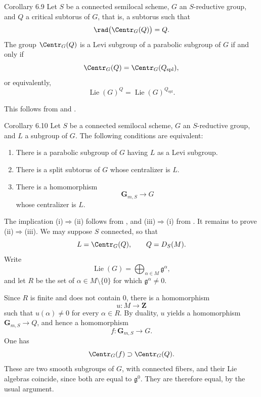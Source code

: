 \begin{sgastatement}{Corollary 6.9}
Let \(S\) be a connected semilocal scheme, \(G\) an
\(S\)-reductive group, and \(Q\) a critical subtorus of \(G\), that
is, a subtorus such that
\[
 \rad\bigl(\Centr_G(Q)\bigr)=Q.
\]
The group \(\Centr_G(Q)\) is a Levi subgroup of a parabolic subgroup
of \(G\) if and only if
\[
 \Centr_G(Q)=\Centr_G(Q_{\mathrm{spl}}),
\]
or equivalently,
\[
 \operatorname{Lie}(G)^Q
   =\operatorname{Lie}(G)^{Q_{\mathrm{spl}}}.
\]
\end{sgastatement}

This follows from  and .

\begin{sgastatement}{Corollary 6.10}
Let \(S\) be a connected semilocal scheme, \(G\) an
\(S\)-reductive group, and \(L\) a subgroup of \(G\).  The following
conditions are equivalent:
\begin{enumerate}[label=\textup{(\roman*)}]
\item There is a parabolic subgroup of \(G\) having \(L\) as a Levi
subgroup.
\item There is a split subtorus of \(G\) whose centralizer is \(L\).
\item There is a homomorphism
\[
 \mathbf G_{m,S}\longrightarrow G
\]
whose centralizer is \(L\).
\end{enumerate}
\end{sgastatement}

The implication \textup{(i)}\(\Rightarrow\)\textup{(ii)} follows
from , and \textup{(iii)}\(\Rightarrow\)\textup{(i)} from .
It remains to prove
\textup{(ii)}\(\Rightarrow\)\textup{(iii)}.  We may suppose \(S\)
connected, so that
\[
 L=\Centr_G(Q),\qquad Q=D_S(M).
\]
Write
\[
 \operatorname{Lie}(G)=\bigoplus_{\alpha\in M}\mathfrak g^\alpha,
\]
and let \(R\) be the set of
\(\alpha\in M\setminus\{0\}\) for which
\(\mathfrak g^\alpha\ne0\).

Since \(R\) is finite and does not contain \(0\), there is a
homomorphism
\[
 u:M\longrightarrow\mathbf Z
\]
such that \(u(\alpha)\ne0\) for every \(\alpha\in R\).  By duality,
\(u\) yields a homomorphism \(\mathbf G_{m,S}\to Q\), and hence a
homomorphism
\[
 f:\mathbf G_{m,S}\longrightarrow G.
\]
One has
\[
 \Centr_G(f)\supset\Centr_G(Q).
\]
These are two smooth subgroups of \(G\), with connected fibers, and
their Lie algebras coincide, since both are equal to
\(\mathfrak g^0\).  They are therefore equal, by the usual
argument.

